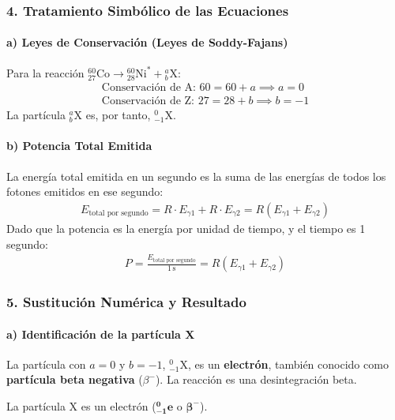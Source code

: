 \subsubsection*{4. Tratamiento Simbólico de las Ecuaciones}
\paragraph*{a) Leyes de Conservación (Leyes de Soddy-Fajans)}
Para la reacción ${}_{27}^{60}\text{Co}\rightarrow{}_{28}^{60}\text{Ni}^{*}+{}_{b}^{a}\text{X}$:
\begin{gather}
    \text{Conservación de A: } 60 = 60 + a \implies a = 0 \\
    \text{Conservación de Z: } 27 = 28 + b \implies b = -1
\end{gather}
La partícula ${}_{b}^{a}\text{X}$ es, por tanto, ${}_{-1}^{0}\text{X}$.

\paragraph*{b) Potencia Total Emitida}
La energía total emitida en un segundo es la suma de las energías de todos los fotones emitidos en ese segundo:
\begin{gather}
    E_{\text{total por segundo}} = R \cdot E_{\gamma1} + R \cdot E_{\gamma2} = R (E_{\gamma1} + E_{\gamma2})
\end{gather}
Dado que la potencia es la energía por unidad de tiempo, y el tiempo es 1 segundo:
\begin{gather}
    P = \frac{E_{\text{total por segundo}}}{1 \, \text{s}} = R (E_{\gamma1} + E_{\gamma2}) \label{eq:potencia_gamma}
\end{gather}

\subsubsection*{5. Sustitución Numérica y Resultado}
\paragraph*{a) Identificación de la partícula X}
La partícula con $a=0$ y $b=-1$, ${}_{-1}^{0}\text{X}$, es un \textbf{electrón}, también conocido como \textbf{partícula beta negativa} ($\beta^-$). La reacción es una desintegración beta.
\begin{cajaresultado}
    La partícula X es un electrón ($\boldsymbol{{}_{-1}^{0}e}$ o $\boldsymbol{\beta^-}$).
\end{cajaresultado}

